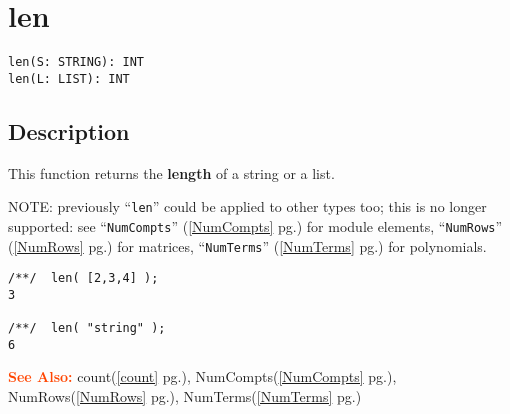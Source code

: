 \documentclass[a4paper]{mybook}
\newenvironment{command}{}{} %
\newcommand\SeeAlso{\par\textcolor{OrangeRed}{\textbf{\large See Also: }}}
\begin{document}
\section{len}
\label{len}
\begin{command} %


\begin{Verbatim}[label=syntax, rulecolor=\color{MidnightBlue},
frame=single]
len(S: STRING): INT
len(L: LIST): INT
\end{Verbatim}


\subsection*{Description}

This function returns the \textbf{length} of a string or a list.
\par 
NOTE: 
previously ``\verb&len&'' could be applied to other types too; this is no
longer supported: see
``\verb&NumCompts&'' (\ref{NumCompts} pg.\pageref{NumCompts}) for module elements,
``\verb&NumRows&'' (\ref{NumRows} pg.\pageref{NumRows}) for matrices,
``\verb&NumTerms&'' (\ref{NumTerms} pg.\pageref{NumTerms}) for polynomials.
\begin{Verbatim}[label=example, rulecolor=\color{PineGreen}, frame=single]
/**/  len( [2,3,4] );
3

/**/  len( "string" );
6
\end{Verbatim}


\SeeAlso %
  count(\ref{count} pg.\pageref{count}), 
    NumCompts(\ref{NumCompts} pg.\pageref{NumCompts}), 
    NumRows(\ref{NumRows} pg.\pageref{NumRows}), 
    NumTerms(\ref{NumTerms} pg.\pageref{NumTerms})
\end{command} %
\end{document}
